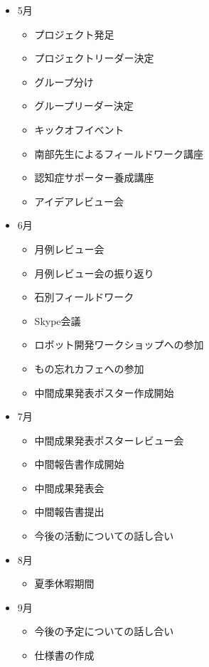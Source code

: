 \documentclass[../report]{subfiles}
\begin{document}
\begin{itemize}
\begin{itemize}
    \item[] 5月
    \begin{itemize}
        \item プロジェクト発足
        \item プロジェクトリーダー決定
        \item グループ分け
        \item グループリーダー決定
        \item キックオフイベント
        \item 南部先生によるフィールドワーク講座
        \item 認知症サポーター養成講座
        \item アイデアレビュー会
    \end{itemize}
    \item[] 6月
    \begin{itemize}
        \item 月例レビュー会
        \item 月例レビュー会の振り返り
        \item 石別フィールドワーク
        \item Skype会議
        \item ロボット開発ワークショップへの参加
        \item もの忘れカフェへの参加
        \item 中間成果発表ポスター作成開始
    \end{itemize}
    \item[] 7月
    \begin{itemize}
        \item 中間成果発表ポスターレビュー会
        \item 中間報告書作成開始
        \item 中間成果発表会
        \item 中間報告書提出
        \item 今後の活動についての話し合い
    \end{itemize}
    \item[] 8月
    \begin{itemize}
        \item 夏季休暇期間
    \end{itemize}
    \item[] 9月
    \begin{itemize}
        \item 今後の予定についての話し合い
        \item 仕様書の作成

\end{itemize}
\end{itemize}
\end{itemize}
\end{document}
